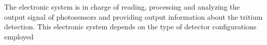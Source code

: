 The electronic system is in charge of reading, processing and analyzing the output signal of photosensors and providing output information about the tritium detection. This electronic system depends on the type of detector configurations employed


 